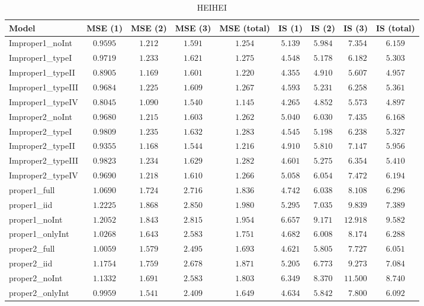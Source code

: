 \begin{table}

\caption{\label{tab:model-choice-sc6}HEIHEI}
\centering
\begin{tabular}{lcccccccc}
\hline
Model  & MSE (1) & MSE (2) & MSE (3) & MSE (total) & IS (1) & IS (2) & IS (3) & \multicolumn{1}{c}{IS (total)} \\ 
\hline
Improper1_noInt  & $0.9595$ & $1.212$ & $1.591$ & $1.254$ & $5.139$ & $5.984$ & $\phantom{0}7.354$ & $6.159$ \\
Improper1_typeI  & $0.9719$ & $1.233$ & $1.621$ & $1.275$ & $4.548$ & $5.178$ & $\phantom{0}6.182$ & $5.303$ \\
Improper1_typeII  & $0.8905$ & $1.169$ & $1.601$ & $1.220$ & $4.355$ & $4.910$ & $\phantom{0}5.607$ & $4.957$ \\
Improper1_typeIII  & $0.9684$ & $1.225$ & $1.609$ & $1.267$ & $4.593$ & $5.231$ & $\phantom{0}6.258$ & $5.361$ \\
Improper1_typeIV  & $0.8045$ & $1.090$ & $1.540$ & $1.145$ & $4.265$ & $4.852$ & $\phantom{0}5.573$ & $4.897$ \\
Improper2_noInt  & $0.9680$ & $1.215$ & $1.603$ & $1.262$ & $5.040$ & $6.030$ & $\phantom{0}7.435$ & $6.168$ \\
Improper2_typeI  & $0.9809$ & $1.235$ & $1.632$ & $1.283$ & $4.545$ & $5.198$ & $\phantom{0}6.238$ & $5.327$ \\
Improper2_typeII  & $0.9355$ & $1.168$ & $1.544$ & $1.216$ & $4.910$ & $5.810$ & $\phantom{0}7.147$ & $5.956$ \\
Improper2_typeIII  & $0.9823$ & $1.234$ & $1.629$ & $1.282$ & $4.601$ & $5.275$ & $\phantom{0}6.354$ & $5.410$ \\
Improper2_typeIV  & $0.9690$ & $1.218$ & $1.610$ & $1.266$ & $5.058$ & $6.054$ & $\phantom{0}7.472$ & $6.194$ \\
proper1_full  & $1.0690$ & $1.724$ & $2.716$ & $1.836$ & $4.742$ & $6.038$ & $\phantom{0}8.108$ & $6.296$ \\
proper1_iid  & $1.2225$ & $1.868$ & $2.850$ & $1.980$ & $5.295$ & $7.035$ & $\phantom{0}9.839$ & $7.389$ \\
proper1_noInt  & $1.2052$ & $1.843$ & $2.815$ & $1.954$ & $6.657$ & $9.171$ & $12.918$ & $9.582$ \\
proper1_onlyInt  & $1.0268$ & $1.643$ & $2.583$ & $1.751$ & $4.682$ & $6.008$ & $\phantom{0}8.174$ & $6.288$ \\
proper2_full  & $1.0059$ & $1.579$ & $2.495$ & $1.693$ & $4.621$ & $5.805$ & $\phantom{0}7.727$ & $6.051$ \\
proper2_iid  & $1.1754$ & $1.759$ & $2.678$ & $1.871$ & $5.205$ & $6.773$ & $\phantom{0}9.273$ & $7.084$ \\
proper2_noInt  & $1.1332$ & $1.691$ & $2.583$ & $1.803$ & $6.349$ & $8.370$ & $11.500$ & $8.740$ \\
proper2_onlyInt  & $0.9959$ & $1.541$ & $2.409$ & $1.649$ & $4.634$ & $5.842$ & $\phantom{0}7.800$ & $6.092$ \\
\hline 
\end{tabular}


\end{table}